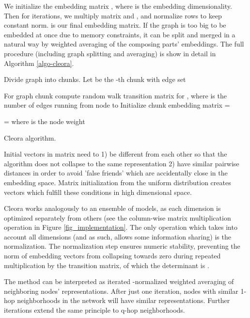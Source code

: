 \documentclass{IEEEtran}
\begin{document}
We initialize the embedding matrix , where  is the embedding dimensionality. Then for  iterations, we multiply matrix  and , and normalize rows to keep constant  norm.  is our final embedding matrix. If the graph is too big to be embedded at once due to memory constraints, it can be split and merged in a natural way by weighted averaging of the composing parts' embeddings. The full procedure (including graph splitting and averaging) is show in detail in Algorithm \ref{algo-cleora}.

\begin{algorithm}[]
Divide graph  into  chunks. Let  be the -th chunk with edge set \;

 {
 For graph chunk  compute random walk transition matrix  for , where  is the number of edges running from node  to   \;
 Initialize chunk embedding matrix  \;
  = \;
 }
 
  {
     =  where  is the node weight 
 }
 \caption{Cleora algorithm.}
 \label{algo-cleora}
\end{algorithm}



Initial vectors in matrix  need to 1) be different from each other so that the algorithm does not collapse to the same representation 2) have similar pairwise distances in order to avoid 'false friends' which are accidentally close in the embedding space. Matrix initialization from the uniform distribution creates vectors which fulfill these conditions in high dimensional space.

Cleora works analogously to an ensemble of  models, as each dimension is optimized separately from others (see the column-wise matrix multiplication operation in Figure \ref{fig_implementation}. The only operation which takes into account all dimensions (and as such, allows some information sharing) is the  normalization. The normalization step ensures numeric stability, preventing the norm of embedding vectors from collapsing towards zero during repeated multiplication by the transition matrix, of which the determinant is .

The method can be interpreted as iterated -normalized weighted averaging of neighboring nodes' representations. After just one iteration, nodes with similar 1-hop neighborhoods in the network will have similar representations. Further iterations extend the same principle to q-hop neighborhoods. 
\end{document}
